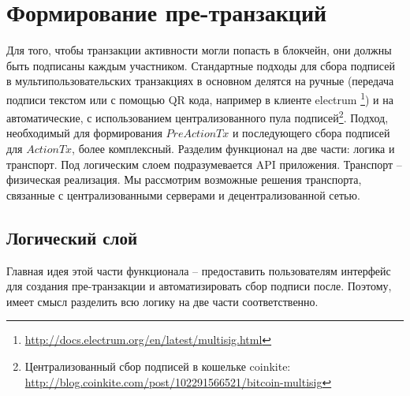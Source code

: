 \documentclass[]{itmo-student-thesis}
\begin{document}
\section{Формирование пре-транзакций}

Для того, чтобы транзакции активности могли попасть в блокчейн, они
должны быть подписаны каждым участником. Стандартные подходы для сбора
подписей в мультипользовательских транзакциях в основном делятся на
ручные (передача подписи текстом или с помощью QR кода, например в
клиенте
electrum \footnote{\url{http://docs.electrum.org/en/latest/multisig.html}})
и на автоматические, с использованием централизованного пула
подписей\footnote{Централизованный сбор подписей в кошельке coinkite:
  \url{http://blog.coinkite.com/post/102291566521/bitcoin-multisig}}. Подход,
необходимый для формирования $PreActionTx$ и последующего сбора
подписей для $ActionTx$, более комплексный. Разделим функционал на две
части: логика и транспорт. Под логическим слоем подразумевается API
приложения. Транспорт -- физическая реализация. Мы рассмотрим
возможные решения транспорта, связанные с централизованными серверами
и децентрализованной сетью.

\subsection{Логический слой}

Главная идея этой части функционала -- предоставить пользователям
интерфейс для создания пре-транзакции и автоматизировать сбор подписи
после. Поэтому, имеет смысл разделить всю логику на две части соответственно.
\end{document}
